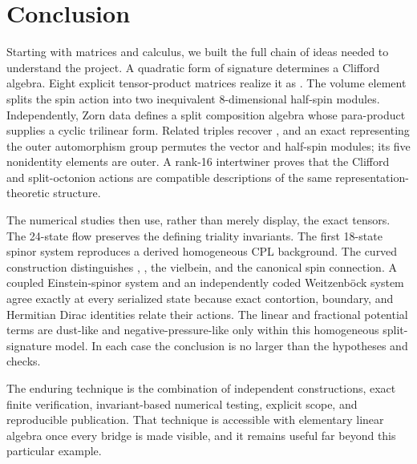 \documentclass[11pt]{article}
\begin{document}
\section{Conclusion}

Starting with matrices and calculus, we built the full chain of ideas needed to understand the project. A quadratic form of signature \texttt{} determines a Clifford algebra. Eight explicit tensor-product matrices realize it as \texttt{}. The volume element splits the spin action into two inequivalent 8-dimensional half-spin modules. Independently, Zorn data defines a split composition algebra whose para-product supplies a cyclic trilinear form. Related triples recover \texttt{}, and an exact \texttt{} representing the outer automorphism group permutes the vector and half-spin modules; its five nonidentity elements are outer. A rank-16 intertwiner proves that the Clifford and split-octonion actions are compatible descriptions of the same representation-theoretic structure.

The numerical studies then use, rather than merely display, the exact tensors. The 24-state flow preserves the defining triality invariants. The first 18-state spinor system reproduces a derived homogeneous CPL background. The curved construction distinguishes \texttt{}, \texttt{}, the vielbein, and the canonical spin connection. A coupled Einstein-spinor system and an independently coded Weitzenböck system agree exactly at every serialized state because exact contortion, boundary, and Hermitian Dirac identities relate their actions. The linear and fractional potential terms are dust-like and negative-pressure-like only within this homogeneous split-signature model. In each case the conclusion is no larger than the hypotheses and checks.

The enduring technique is the combination of independent constructions, exact finite verification, invariant-based numerical testing, explicit scope, and reproducible publication. That technique is accessible with elementary linear algebra once every bridge is made visible, and it remains useful far beyond this particular example.
\end{document}
